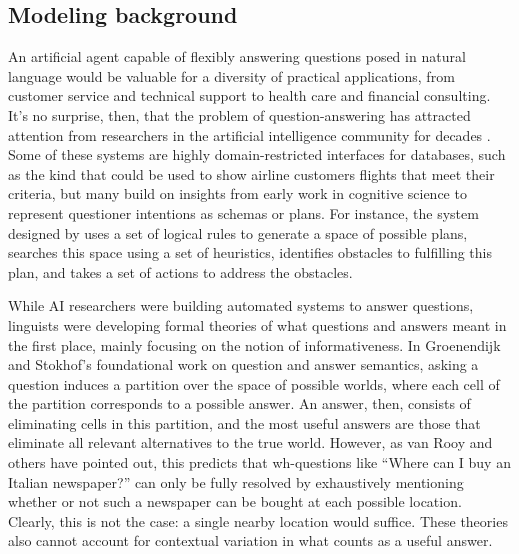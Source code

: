 \documentclass[12pt, floatsintext, jou]{apa6}
\begin{document}
\subsection{Modeling background}

An artificial agent capable of flexibly answering questions posed in natural language would be valuable for a diversity of practical applications, from customer service and technical support to health care and financial consulting. It's no surprise, then, that the problem of question-answering has attracted attention from researchers in the artificial intelligence community for decades \cite{Simmons65_QuestionsComputer, Lehnert77_QuestionAnswering, AllenPerrault80_IntentionUtterances, GreenCarberry94_IndirectAnswersModel, MollaVicedo07_QARestrictedDomains}. Some of these systems are highly domain-restricted interfaces for databases, such as the kind that could be used to show airline customers flights that meet their criteria, but many build on insights from early work in cognitive science to represent questioner intentions as schemas or plans. For instance, the system designed by  uses a set of logical rules to generate a space of possible plans, searches this space using a set of heuristics, identifies obstacles to fulfilling this plan, and takes a set of actions to address the obstacles. 

While AI researchers were building automated systems to answer questions, linguists were developing formal theories of what questions and answers meant in the first place, mainly focusing on the notion of informativeness. In Groenendijk and Stokhof's \citeyear{GroenendijkStokhof84_SemanticsOfQuestions} foundational work on question and answer semantics, asking a question induces a partition over the space of possible worlds, where each cell of the partition corresponds to a possible answer. An answer, then, consists of eliminating cells in this partition, and the most useful answers are those that eliminate all relevant alternatives to the true world. However, as van Rooy \citeyear{VanRooy03_QuestioningDecisionProblems} and others \cite{Ginzburg95_ResolvingQuestions} have pointed out, this predicts that wh-questions like ``Where can I buy an Italian newspaper?'' can only be fully resolved by exhaustively mentioning whether or not such a newspaper can be bought at each possible location. Clearly, this is not the case: a single nearby location would suffice. These theories also cannot account for contextual variation in what counts as a useful answer.
\end{document}
